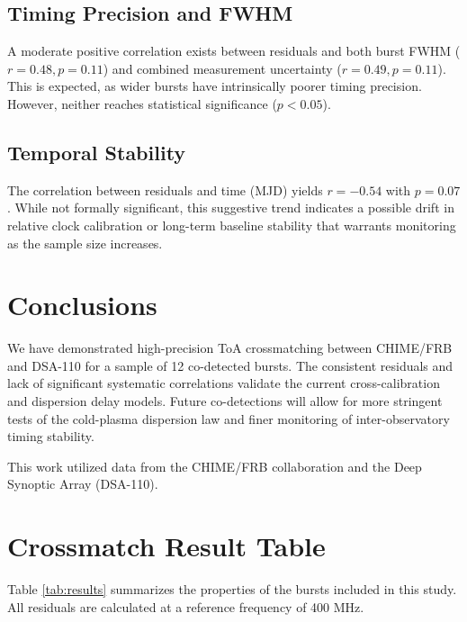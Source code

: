 \documentclass[twocolumn]{aastex631}
\begin{document}
\subsection{Timing Precision and FWHM}

A moderate positive correlation exists between residuals and both burst FWHM ($r=0.48, p=0.11$) and combined measurement uncertainty ($r=0.49, p=0.11$). This is expected, as wider bursts have intrinsically poorer timing precision. However, neither reaches statistical significance ($p < 0.05$).

\subsection{Temporal Stability}

The correlation between residuals and time (MJD) yields $r=-0.54$ with $p=0.07$. While not formally significant, this suggestive trend indicates a possible drift in relative clock calibration or long-term baseline stability that warrants monitoring as the sample size increases.

\section{Conclusions} \label{sec:conclusions}

We have demonstrated high-precision ToA crossmatching between CHIME/FRB and DSA-110 for a sample of 12 co-detected bursts. The consistent residuals and lack of significant systematic correlations validate the current cross-calibration and dispersion delay models. Future co-detections will allow for more stringent tests of the cold-plasma dispersion law and finer monitoring of inter-observatory timing stability.

\begin{acknowledgments}
This work utilized data from the CHIME/FRB collaboration and the Deep Synoptic Array (DSA-110).
\end{acknowledgments}

\appendix
\section{Crossmatch Result Table}

Table \ref{tab:results} summarizes the properties of the bursts included in this study. All residuals are calculated at a reference frequency of 400 MHz.
\end{document}
